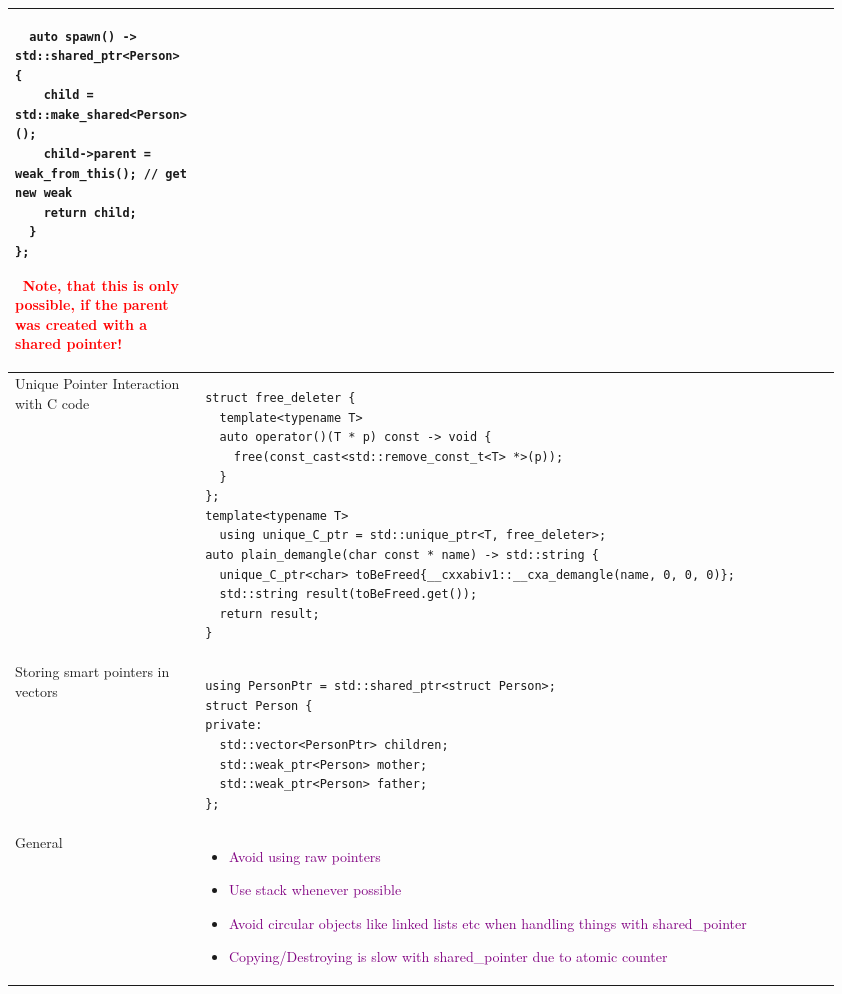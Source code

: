 \documentclass[main.tex,fontsize=8pt,paper=a4,paper=portrait,DIV=calc,]{scrartcl}
\begin{document}
\begin{table}[ht!]
\begin{tabular}{|m{0.2\linewidth}|m{0.755\linewidth}|}
\begin{lstlisting}
  auto spawn() -> std::shared_ptr<Person> {
    child = std::make_shared<Person>();
    child->parent = weak_from_this(); // get new weak
    return child;
  }
};
\end{lstlisting} 
\, \newline
\textcolor{red}{Note, that this is only possible, if the parent \textbf{was created with a shared pointer!}}\\
\hline
Unique Pointer Interaction with C code & 
\vspace{2mm}
\begin{lstlisting}
struct free_deleter {
  template<typename T>
  auto operator()(T * p) const -> void {
    free(const_cast<std::remove_const_t<T> *>(p));
  }
};
template<typename T>
  using unique_C_ptr = std::unique_ptr<T, free_deleter>;
auto plain_demangle(char const * name) -> std::string {
  unique_C_ptr<char> toBeFreed{__cxxabiv1::__cxa_demangle(name, 0, 0, 0)};
  std::string result(toBeFreed.get());
  return result;
}
\end{lstlisting}\\
\hline
Storing smart pointers in vectors & 
\vspace{2mm}
\begin{lstlisting}
using PersonPtr = std::shared_ptr<struct Person>;
struct Person {
private:
  std::vector<PersonPtr> children;
  std::weak_ptr<Person> mother;
  std::weak_ptr<Person> father;
};
\end{lstlisting}\\
\hline
General & 
\vspace{2mm}
\begin{itemize}
\item \textcolor{purple}{Avoid using raw pointers}
\item \textcolor{purple}{Use stack whenever possible}
\item \textcolor{purple}{Avoid circular objects like linked lists etc when handling things with shared\_pointer}
\item \textcolor{purple}{Copying/Destroying is slow with shared\_pointer due to atomic counter}
\vspace{-3mm}
\end{itemize}\\ 
\hline
\end{tabular}
\end{table}
\pagebreak
\end{document}
